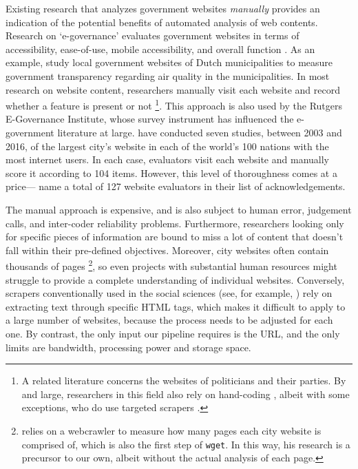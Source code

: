 \documentclass[11pt]{article}
\begin{document}

Existing research that analyzes government websites \textit{manually} provides an indication of the potential benefits of automated analysis of web contents. Research on `e-governance' evaluates government websites in terms of accessibility, ease-of-use, mobile accessibility, and overall function \citep[e.g., ][]{Urban2002,tolbert2008institutions,mcnutt2010virtual,Armstrong2011,Feeney2017,mossey2019harnessing}. As an example, \cite{grimmelikhuijsen2012developing} study local government websites of Dutch municipalities to measure government transparency regarding air quality in the municipalities. In most research on website content, researchers manually visit each website and record whether a feature is present or not \citep{kaylor2001gauging, Urban2002, jeffres2006metropolitan, Armstrong2011, dolson2012explaining, Feeney2017}\footnote{A related literature concerns the websites of politicians and their parties. By and large, researchers in this field also rely on hand-coding \citep{Norris2003,Druckman2009,Druckman2010,Esterling2011}, albeit with some exceptions, who do use targeted scrapers \citep{Therriault2010,cryer2019navigating}.}. This approach is also used by the Rutgers E-Governance Institute, whose survey instrument has influenced the e-government literature at large. \cite{holzer2016digital} have conducted seven studies, between 2003 and 2016, of the largest city's website in each of the world's 100 nations with the most internet users. In each case, evaluators visit each website and manually score it according to 104 items. However, this level of thoroughness comes at a price---\cite{holzer2016digital} name a total of 127 website evaluators in their list of acknowledgements.

The manual approach is expensive, and is also subject to human error, judgement calls, and inter-coder reliability problems. Furthermore, researchers looking only for specific pieces of information are bound to miss a lot of content that doesn't fall within their pre-defined objectives. Moreover, city websites often contain thousands of pages \citep{Urban2002}\footnote{\cite{Urban2002} relies on a webcrawler to measure how many pages each city website is comprised of, which is also the first step of \texttt{wget}. In this way, his research is a precursor to our own, albeit without the actual analysis of each page.}, so even projects with substantial human resources might struggle to provide a complete understanding of individual websites. Conversely, scrapers conventionally used in the social sciences (see, for example, \citealt{cryer2019navigating}) rely on extracting text through specific HTML tags, which makes it difficult to apply to a large number of websites, because the process needs to be adjusted for each one. By contrast, the only input our pipeline requires is the URL, and the only limits are bandwidth, processing power and storage space.
\end{document}
